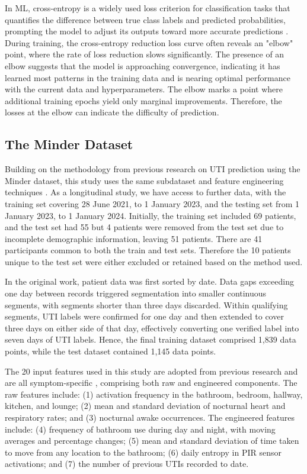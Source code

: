 In \gls{ML}, cross-entropy is a widely used loss criterion for classification tasks that quantifies the difference between true class labels and predicted probabilities, prompting the model to adjust its outputs toward more accurate predictions \cite{cross_entropy}. During training, the cross-entropy reduction loss curve often reveals an "elbow" point, where the rate of loss reduction slows significantly. The presence of an elbow suggests that the model is approaching convergence, indicating it has learned most patterns in the training data and is nearing optimal performance with the current data and hyperparameters. The elbow marks a point where additional training epochs yield only marginal improvements. Therefore, the losses at the elbow can indicate the difficulty of prediction.


\subsection{The Minder Dataset}

Building on the methodology from previous research on \gls{UTI} prediction using the Minder dataset, this study uses the same subdataset and feature engineering techniques \cite{capstick2024digital_UTI_prediction}. As a longitudinal study, we have access to further data, with the training set covering 28 June 2021, to 1 January 2023, and the testing set from 1 January 2023, to 1 January 2024. Initially, the training set included 69 patients, and the test set had 55 but 4 patients were removed from the test set due to incomplete demographic information, leaving 51 patients. There are 41 participants common to both the train and test sets. Therefore the 10 patients unique to the test set were either excluded or retained based on the method used.

In the original work, patient data was first sorted by date. Data gaps exceeding one day between records triggered segmentation into smaller continuous segments, with segments shorter than three days discarded. Within qualifying segments, \gls{UTI} labels were confirmed for one day and then extended to cover three days on either side of that day, effectively converting one verified label into seven days of \gls{UTI} labels. Hence, the final training dataset comprised 1,839 data points, while the test dataset contained 1,145 data points.

The 20 input features used in this study are adopted from previous research and are all symptom-specific \cite{capstick2024digital_UTI_prediction}, comprising both raw and engineered components. The raw features include: (1) activation frequency in the bathroom, bedroom, hallway, kitchen, and lounge; (2) mean and standard deviation of nocturnal heart and respiratory rates; and (3) nocturnal awake occurrences. The engineered features include: (4) frequency of bathroom use during day and night, with moving averages and percentage changes; (5) mean and standard deviation of time taken to move from any location to the bathroom; (6) daily entropy in \gls{PIR} sensor activations; and (7) the number of previous \gls{UTI}s recorded to date.